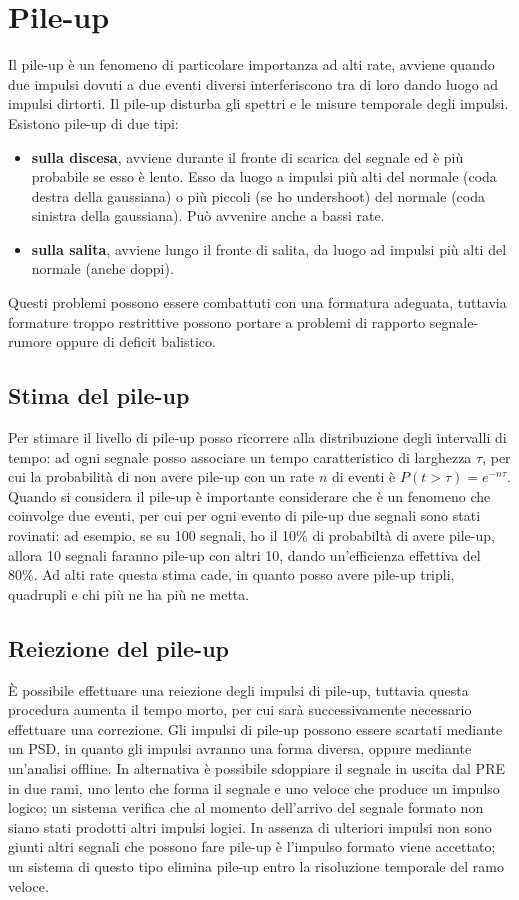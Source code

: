 \chapter{Pile-up}
Il pile-up \`e un fenomeno di particolare importanza ad alti rate, avviene quando due impulsi dovuti a due eventi diversi interferiscono tra di loro
dando luogo ad impulsi dirtorti.
Il pile-up disturba gli spettri e le misure temporale degli impulsi.
Esistono pile-up di due tipi:
\begin{itemize}
\item \textbf{sulla discesa}, avviene durante il fronte di scarica del segnale ed \`e pi\`u probabile se esso \`e lento. Esso da luogo a impulsi
pi\`u alti del normale (coda destra della gaussiana) o pi\`u piccoli (se ho undershoot) del normale (coda sinistra della gaussiana). Pu\`o avvenire
anche a bassi rate.
\item \textbf{sulla salita}, avviene lungo il fronte di salita, da luogo ad impulsi pi\`u alti del normale (anche doppi). 
\end{itemize}
Questi problemi possono essere combattuti con una formatura adeguata, tuttavia formature troppo restrittive possono portare a problemi di rapporto segnale-rumore
oppure di deficit balistico.
\section{Stima del pile-up}
Per stimare il livello di pile-up posso ricorrere alla distribuzione degli intervalli di tempo:
ad ogni segnale posso associare un tempo caratteristico di larghezza $\tau$, per cui la probabilit\`a di non avere
pile-up con un rate $n$ di eventi \`e $P(t>\tau) = e^{-n\tau}$.
Quando si considera il pile-up \`e importante considerare che \`e un fenomeno che coinvolge due eventi, per cui per ogni evento di pile-up
due segnali sono stati rovinati: ad esempio, se su 100 segnali, ho il 10\% di probabilt\`a di avere pile-up, allora 10 segnali faranno
pile-up con altri 10, dando un'efficienza effettiva del 80\%.
Ad alti rate questa stima cade, in quanto posso avere pile-up tripli, quadrupli e chi pi\`u ne ha pi\`u ne metta.
\section{Reiezione del pile-up}
\`E possibile effettuare una reiezione degli impulsi di pile-up, tuttavia questa procedura aumenta il tempo morto, per cui sar\`a successivamente
necessario effettuare una correzione.
Gli impulsi di pile-up possono essere scartati mediante un PSD, in quanto gli impulsi avranno una forma diversa, oppure mediante un'analisi offline.
In alternativa \`e possibile sdoppiare il segnale in uscita dal PRE in due rami, uno lento che forma il segnale e uno veloce che produce un impulso logico;
un sistema verifica che al momento dell'arrivo del segnale formato non siano stati prodotti altri impulsi logici.
In assenza di ulteriori impulsi non sono giunti altri segnali che possono fare pile-up \`e l'impulso formato viene accettato; un sistema di questo tipo elimina pile-up entro la risoluzione temporale del ramo veloce.
